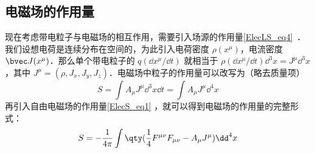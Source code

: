 \subsection{电磁场的作用量}
现在考虑带电粒子与电磁场的相互作用，需要引入场源的作用量\autoref{ElecLS_eq4}~．我们设想电荷是连续分布在空间的，为此引入电荷密度 $\rho(x^\mu)$，电流密度 $\bvec J(x^\mu)$．那么单个带电粒子的 $q(\dd x^\mu/\dd t)$ 就相当于 $\rho (\dd x^\mu / \dd t) {\dd} ^3 x=J^\mu {\dd}^3 x$，其中 $J^\mu=(\rho,J_x,J_y,J_z)$．电磁场中粒子的作用量可以改写为（略去质量项）
\begin{equation}
S=\int A_\mu J^\mu {\dd}^3 x\dd t=\int A_\mu J^\mu {\dd}^4 x
\end{equation}
再引入自由电磁场的作用量\autoref{ElecS_eq1} ，就可以得到电磁场的作用量的完整形式：
\begin{equation}
S=-\frac{1}{4\pi}\int \qty(\frac{1}{4}F^{\mu\nu}F_{\mu\nu}-A_\mu J^\mu ){\dd}^4 x
\end{equation}